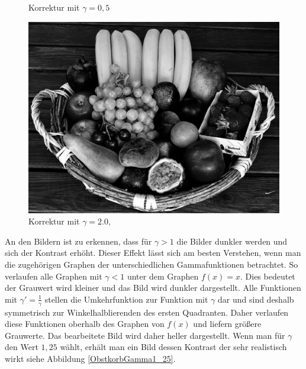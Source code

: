 \documentclass[course=erap]{aspdoc}
\begin{document}
\begin{figure}[h]
\begin{minipage}{0.49\linewidth}
			\caption{Korrektur mit $\gamma = 0,5$}
			\label{ObstkorbGamma0_5}
		\end{minipage}
		\centering
		\begin{minipage}{0.49\linewidth}
			\centering
			\includegraphics[scale=1.2]{Images/fruit_basket_gamma_2.png}
			\caption{Korrektur mit $\gamma = 2.0,$}
			\label{ObstkorbGamma2}
		\end{minipage}
	\end{figure}
	
	
	\noindent
	An den Bildern ist zu erkennen, dass für $\gamma > 1$ die Bilder dunkler werden und sich der Kontrast erhöht. Dieser Effekt lässt sich am besten Verstehen, wenn man die zugehörigen Graphen der unterschiedlichen Gammafunktionen betrachtet. So verlaufen alle Graphen mit $\gamma < 1$  unter dem Graphen $f(x)=x$. Dies bedeutet der Grauwert wird kleiner und das Bild wird dunkler dargestellt. Alle Funktionen mit $\gamma ' = \frac{1}{\gamma}$ stellen die Umkehrfunktion zur Funktion mit $\gamma$ dar und sind deshalb symmetrisch zur Winkelhalblierenden des ersten Quadranten. Daher verlaufen diese Funktionen oberhalb des Graphen von $f(x)$ und liefern größere Grauwerte. Das bearbeitete Bild wird daher heller dargestellt. Wenn man für $\gamma$ den Wert $1,25$ wählt, erhält man ein Bild dessen Kontrast der sehr realistisch wirkt siehe Abbildung \ref{ObstkorbGamma1_25}.   
	
\end{document}
